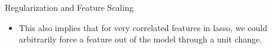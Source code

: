 \documentclass[11pt,compress,t,notes=noshow, xcolor=table]{beamer}
\begin{document}
\begin{vbframe}{Regularization and Feature Scaling}
\begin{itemize}
    \item This also implies that for very correlated features in lasso, we could arbitrarily force a feature out of the model through a unit change.
\end{itemize}

\framebreak

\end{vbframe}
\end{document}
